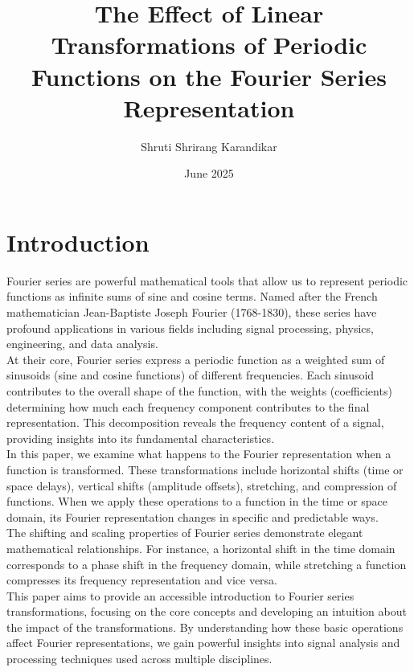 \documentclass{article}
\title{The Effect of Linear Transformations of Periodic Functions on the Fourier Series Representation}
\author{Shruti Shrirang Karandikar}
\date{June 2025}
\begin{document}
\maketitle

\section{Introduction}

Fourier series are powerful mathematical tools that allow us to represent periodic functions as infinite sums of sine and cosine terms. Named after the French mathematician Jean-Baptiste Joseph Fourier (1768-1830), these series have profound applications in various fields including signal processing, physics, engineering, and data analysis.\\

At their core, Fourier series express a periodic function as a weighted sum of sinusoids (sine and cosine functions) of different frequencies. Each sinusoid contributes to the overall shape of the function, with the weights (coefficients) determining how much each frequency component contributes to the final representation. This decomposition reveals the frequency content of a signal, providing insights into its fundamental characteristics.\\

In this paper, we examine what happens to the Fourier representation when a function is transformed. These transformations include horizontal shifts (time or space delays), vertical shifts (amplitude offsets), stretching, and compression of functions. When we apply these operations to a function in the time or space domain, its Fourier representation changes in specific and predictable ways.\\

The shifting and scaling properties of Fourier series demonstrate elegant mathematical relationships. For instance, a horizontal shift in the time domain corresponds to a phase shift in the frequency domain, while stretching a function compresses its frequency representation and vice versa.\\

This paper aims to provide an accessible introduction to Fourier series transformations, focusing on the core concepts and developing an intuition about the impact of the transformations. By understanding how these basic operations affect Fourier representations, we gain powerful insights into signal analysis and processing techniques used across multiple disciplines.\\
\end{document}
